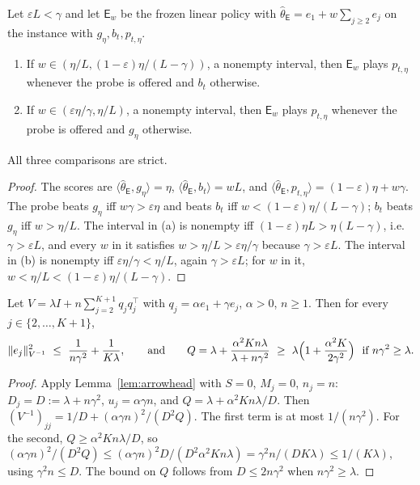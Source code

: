 \documentclass[anon]{alt2027} %
\newcommand{\eps}{\varepsilon}
\newcommand{\Exp}{\mathsf{E}}
\begin{document}
\begin{lemma}
\label{lem:expert-routes}
Let $\eps L<\gamma$ and let $\Exp_w$ be the frozen linear policy with
$\widehat\theta_{\Exp}=e_1+w\sum_{j\ge2}e_j$ on the instance with $g_\eta,b_t,p_{t,\eta}$.
\begin{enumerate}[itemsep=1pt,topsep=1pt,leftmargin=*]
\item[(a)] If $w\in(\eta/L,(1-\eps)\eta/(L-\gamma))$, a nonempty interval, then
$\Exp_w$ plays $p_{t,\eta}$ whenever the probe is offered and $b_t$ otherwise.
\item[(b)] If $w\in(\eps\eta/\gamma,\eta/L)$, a nonempty interval, then $\Exp_w$ plays
$p_{t,\eta}$ whenever the probe is offered and $g_\eta$ otherwise.
\end{enumerate}
All three comparisons are strict.
\end{lemma}

\begin{proof}
The scores are $\langle\widehat\theta_{\Exp},g_\eta\rangle=\eta$,
$\langle\widehat\theta_{\Exp},b_t\rangle=wL$, and
$\langle\widehat\theta_{\Exp},p_{t,\eta}\rangle=(1-\eps)\eta+w\gamma$. The probe beats
$g_\eta$ iff $w\gamma>\eps\eta$ and beats $b_t$ iff $w<(1-\eps)\eta/(L-\gamma)$; $b_t$
beats $g_\eta$ iff $w>\eta/L$. The interval in (a) is nonempty iff
$(1-\eps)\eta L>\eta(L-\gamma)$, i.e.\ $\gamma>\eps L$, and every $w$ in it satisfies
$w>\eta/L>\eps\eta/\gamma$ because $\gamma>\eps L$. The interval in (b) is nonempty iff
$\eps\eta/\gamma<\eta/L$, again $\gamma>\eps L$; for $w$ in it, $w<\eta/L<(1-\eps)\eta/(L-\gamma)$.
\end{proof}

\begin{lemma}
\label{lem:cat-handoff}
Let $V=\lambda I+n\sum_{j=2}^{K+1}q_jq_j^\top$ with $q_j=\alpha e_1+\gamma e_j$, $\alpha>0$,
$n\ge1$. Then for every $j\in\{2,\dots,K+1\}$,
\[
\|e_j\|^2_{V^{-1}}\ \le\ \frac1{n\gamma^2}+\frac1{K\lambda},
\qquad\text{and}\qquad
Q=\lambda+\frac{\alpha^2Kn\lambda}{\lambda+n\gamma^2}\ \ge\ \lambda\Bigl(1+\frac{\alpha^2K}{2\gamma^2}\Bigr)\ \text{ if } n\gamma^2\ge\lambda .
\]
\end{lemma}

\begin{proof}
Apply Lemma~\ref{lem:arrowhead} with $S=0$, $M_j=0$, $n_j=n$: $D_j=D:=\lambda+n\gamma^2$,
$u_j=\alpha \gamma n$, and $Q=\lambda+\alpha^2Kn\lambda/D$. Then
$(V^{-1})_{jj}=1/D+(\alpha \gamma n)^2/(D^2Q)$. The first term is at most $1/(n\gamma^2)$.
For the second, $Q\ge\alpha^2Kn\lambda/D$, so
$(\alpha \gamma n)^2/(D^2Q)\le(\alpha \gamma n)^2D/(D^2\alpha^2Kn\lambda)=\gamma^2n/(DK\lambda)\le1/(K\lambda)$,
using $\gamma^2n\le D$. The bound on $Q$ follows from $D\le2n\gamma^2$ when $n\gamma^2\ge\lambda$.
\end{proof}
\end{document}
